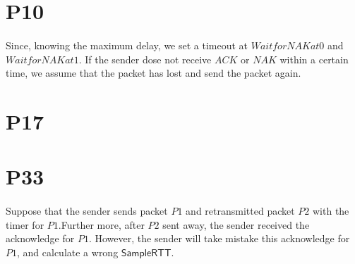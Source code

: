 \documentclass[a4paper, 11pt]{article}
\begin{document}
\section*{P10}
\paragraph{}
Since, knowing the maximum delay, we set a timeout at $Wait for NAK at 0$ and $Wait for NAK at 1$. If the sender dose not receive $ACK$ or $NAK$ within a certain time, we assume that the packet has lost and send the packet again.

\section*{P17}
\newpage

\section*{P33}
\paragraph{}
Suppose that the sender sends packet $P1$ and retransmitted packet $P2$ with the timer for $P1$.Further more, after $P2$ sent away, the sender received the acknowledge for $P1$. However, the sender will take mistake this acknowledge for $P1$, and calculate a wrong $\mathsf{SampleRTT}$.
\end{document}
